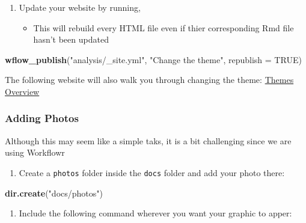\documentclass[]{book}
\newenvironment{Shaded}{\begin{snugshade}}{\end{snugshade}}
\newcommand{\DataTypeTok}[1]{\textcolor[rgb]{0.13,0.29,0.53}{#1}}
\newcommand{\KeywordTok}[1]{\textcolor[rgb]{0.13,0.29,0.53}{\textbf{#1}}}
\newcommand{\NormalTok}[1]{#1}
\newcommand{\OtherTok}[1]{\textcolor[rgb]{0.56,0.35,0.01}{#1}}
\newcommand{\StringTok}[1]{\textcolor[rgb]{0.31,0.60,0.02}{#1}}
\providecommand{\tightlist}{%
  \setlength{\itemsep}{0pt}\setlength{\parskip}{0pt}}
\begin{document}
\begin{enumerate}
\def\labelenumi{\arabic{enumi}.}
\setcounter{enumi}{4}
\tightlist
\item
  Update your website by running,

  \begin{itemize}
  \tightlist
  \item
    This will rebuild every HTML file even if thier corresponding Rmd file hasn't been updated
  \end{itemize}
\end{enumerate}

\begin{Shaded}
\begin{Highlighting}[]
\KeywordTok{wflow_publish}\NormalTok{(}\StringTok{"analysis/_site.yml"}\NormalTok{, }\StringTok{"Change the theme"}\NormalTok{, }\DataTypeTok{republish =} \OtherTok{TRUE}\NormalTok{)}
\end{Highlighting}
\end{Shaded}

The following website will also walk you through changing the theme: \href{https://jdblischak.github.io/workflowr/articles/wflow-02-customization.html\#changing-the-theme}{Themes Overview}

\hypertarget{adding-photos}{%
\subsubsection{Adding Photos}\label{adding-photos}}

Although this may seem like a simple taks, it is a bit challenging since we are using Workflowr

\begin{enumerate}
\def\labelenumi{\arabic{enumi}.}
\tightlist
\item
  Create a \texttt{photos} folder inside the \texttt{docs} folder and add your photo there:
\end{enumerate}

\begin{Shaded}
\begin{Highlighting}[]
\KeywordTok{dir.create}\NormalTok{(}\StringTok{"docs/photos"}\NormalTok{)}
\end{Highlighting}
\end{Shaded}

\begin{enumerate}
\def\labelenumi{\arabic{enumi}.}
\setcounter{enumi}{1}
\tightlist
\item
  Include the following command wherever you want your graphic to apper:
\end{enumerate}
\end{document}
